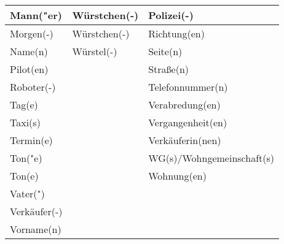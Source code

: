 \documentclass{article}
\begin{document}
\begin{table}[h!]
\begin{tabular}{|>{\raggedright\arraybackslash}p{5cm}|>{\raggedright\arraybackslash}p{5cm}|>{\raggedright\arraybackslash}p{5cm}|}
        Mann("er) & Würstchen(-) & Polizei(-) \\\hline
        Morgen(-) & Würstchen(-) & Richtung(en) \\\hline
        Name(n) & Würstel(-) & Seite(n) \\\hline
        Pilot(en) &  & Stra\ss{}e(n) \\\hline
        Roboter(-) &  & Telefonnummer(n) \\\hline
        Tag(e) &  & Verabredung(en) \\\hline
        Taxi(s) &  & Vergangenheit(en) \\\hline
        Termin(e) &  & Verkäuferin(nen) \\\hline
        Ton("e) &  & WG(s)/Wohngemeinschaft(s) \\\hline
        Ton(e) &  & Wohnung(en) \\\hline
        Vater(") &  &  \\\hline
        Verkäufer(-) &  &  \\\hline
        Vorname(n) &  &  \\\hline
    \end{tabular}
\end{table}
\end{document}
